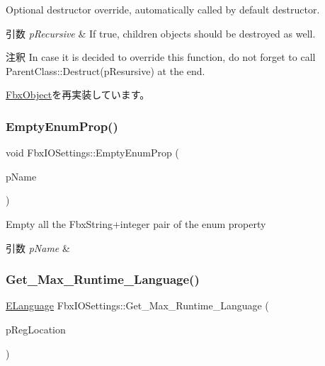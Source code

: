 Optional destructor override, automatically called by default destructor. 
\begin{DoxyParams}{引数}
{\em p\+Recursive} & If true, children objects should be destroyed as well. \\
\hline
\end{DoxyParams}
\begin{DoxyRemark}{注釈}
In case it is decided to override this function, do not forget to call Parent\+Class\+::\+Destruct(p\+Resursive) at the end. 
\end{DoxyRemark}


\hyperlink{class_fbx_object_a123e084d9b32b29c28af6384b7c3c608}{Fbx\+Object}を再実装しています。

\mbox{\label{class_fbx_i_o_settings_a6f30f2ea6148cfe5070444c38842ed6f}} 
\subsubsection{\texorpdfstring{Empty\+Enum\+Prop()}{EmptyEnumProp()}}
{\footnotesize\ttfamily void Fbx\+I\+O\+Settings\+::\+Empty\+Enum\+Prop (\begin{DoxyParamCaption}\item[{const char $\ast$}]{p\+Name }\end{DoxyParamCaption})}

Empty all the Fbx\+String+integer pair of the enum property 
\begin{DoxyParams}{引数}
{\em p\+Name} & \\
\hline
\end{DoxyParams}
\mbox{\label{class_fbx_i_o_settings_a253fc042fe3d373a9e1c369ac2d2bd27}} 
\subsubsection{\texorpdfstring{Get\+\_\+\+Max\+\_\+\+Runtime\+\_\+\+Language()}{Get\_Max\_Runtime\_Language()}}
{\footnotesize\ttfamily \hyperlink{class_fbx_i_o_settings_a84f2effd8e41c382faa5ca58046f323f}{E\+Language} Fbx\+I\+O\+Settings\+::\+Get\+\_\+\+Max\+\_\+\+Runtime\+\_\+\+Language (\begin{DoxyParamCaption}\item[{\hyperlink{class_fbx_string}{Fbx\+String}}]{p\+Reg\+Location }\end{DoxyParamCaption})}

